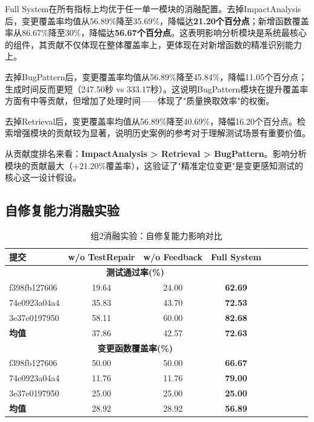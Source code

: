Full System在所有指标上均优于任一单一模块的消融配置。去掉ImpactAnalysis后，变更覆盖率均值从56.89\%降至35.69\%，降幅达\textbf{21.20个百分点}；新增函数覆盖率从86.67\%降至30\%，降幅达\textbf{56.67个百分点}。这表明影响分析模块是系统最核心的组件，其贡献不仅体现在整体覆盖率上，更体现在对新增函数的精准识别能力上。

去掉BugPattern后，变更覆盖率均值从56.89\%降至45.84\%，降幅11.05个百分点；生成时间反而更短（247.50秒 vs 333.17秒）。这说明BugPattern模块在提升覆盖率方面有中等贡献，但增加了处理时间——体现了"质量换取效率"的权衡。

去掉Retrieval后，变更覆盖率均值从56.89\%降至40.69\%，降幅16.20个百分点。检索增强模块的贡献较为显著，说明历史案例的参考对于理解测试场景有重要价值。

从贡献度排名来看：\textbf{ImpactAnalysis > Retrieval > BugPattern}。影响分析模块的贡献最大（+21.20\%覆盖率），这验证了"精准定位变更"是变更感知测试的核心这一设计假设。

\subsection{自修复能力消融实验}
\label{ssec:repair_ablation}

\begin{table}[htbp]
    \centering
    \caption{组2消融实验：自修复能力影响对比}
    \label{tab:ablation-group2}
    \begin{tabular}{lcccccccc}
        \toprule
        \textbf{提交} & \textbf{w/o TestRepair} & \textbf{w/o Feedback} & \textbf{Full System} \\
        \midrule
        \multicolumn{4}{c}{\textbf{测试通过率(\%)}} \\
        \midrule
        f398fb127606 & 19.64 & 24.00 & \textbf{62.69} \\
        74e0923a04a4 & 35.83 & 43.70 & \textbf{72.53} \\
        3e37e0197950 & 58.11 & 60.00 & \textbf{82.68} \\
        \midrule
        \textbf{均值} & 37.86 & 42.57 & \textbf{72.63} \\
        \midrule
        \multicolumn{4}{c}{\textbf{变更函数覆盖率(\%)}} \\
        \midrule
        f398fb127606 & 50.00 & 50.00 & \textbf{66.67} \\
        74e0923a04a4 & 11.76 & 11.76 & \textbf{79.00} \\
        3e37e0197950 & 25.00 & 25.00 & \textbf{25.00} \\
        \midrule
        \textbf{均值} & 28.92 & 28.92 & \textbf{56.89} \\
        \bottomrule
    \end{tabular}
\end{table}

